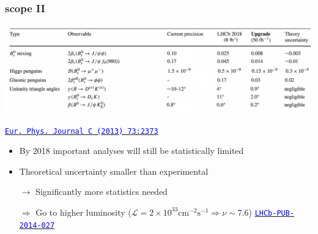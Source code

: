 \documentclass[table,xcolor=dvipsnames,professionalfonts]{beamer}
\newcommand{\myhref}[2]{\href{#1}{\footnotesize{\textcolor{blue}{\texttt{#2}}}}}
\begin{document}
    \begin{frame}
      \frametitle{scope II}
      \includegraphics[width=\textwidth]{./alessiotable.pdf}

      \myhref{https://doi.org/10.1140/epjc/s10052-013-2373-2}{Eur. Phys. Journal C (2013) 73:2373}

      \begin{itemize}
          \item By 2018 important analyses will still be statistically limited
          \item Theoretical uncertainty smaller than experimental
          \item[$\rightarrow$] Significantly more statistics needed
          \item[$\Rightarrow$] Go to higher luminosity
            \newline ($\mathcal{L}=2\times10^{33}\mathrm{cm}^{-2}\mathrm{s}^{-1} \Rightarrow \nu\sim 7.6$)
            \newline \myhref{https://cds.cern.ch/record/1670985?ln=en}{LHCb-PUB-2014-027}
      \end{itemize}
    \end{frame}
\end{document}
